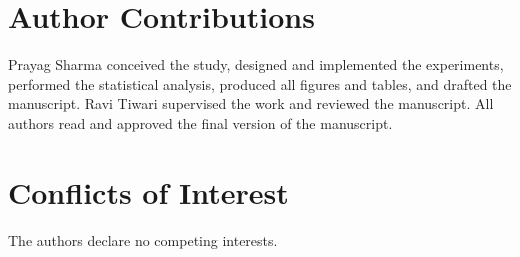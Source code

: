 \section*{Author Contributions}

Prayag Sharma conceived the study, designed and implemented the experiments, performed the
statistical analysis, produced all figures and tables, and drafted the manuscript. Ravi
Tiwari supervised the work and reviewed the manuscript. All authors read and approved the
final version of the manuscript.

\section*{Conflicts of Interest}

The authors declare no competing interests.
